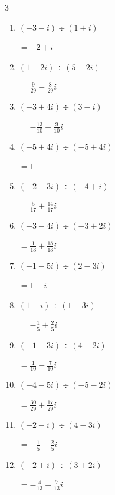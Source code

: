 \begin{multicols}{3}
\begin{enumerate}
        $\displaystyle =\frac{19}{34}+\frac{9}{34}i$

  \item $\displaystyle (-3-i)\div(1+i)$

        $\displaystyle =-2+i$

  \item $\displaystyle (1-2i)\div(5-2i)$

        $\displaystyle =\frac{9}{29}-\frac{8}{29}i$

  \item $\displaystyle (-3+4i)\div(3-i)$

        $\displaystyle =-\frac{13}{10}+\frac{9}{10}i$

  \item $\displaystyle (-5+4i)\div(-5+4i)$

        $\displaystyle =1$

  \item $\displaystyle (-2-3i)\div(-4+i)$

        $\displaystyle =\frac{5}{17}+\frac{14}{17}i$

  \item $\displaystyle (-3-4i)\div(-3+2i)$

        $\displaystyle =\frac{1}{13}+\frac{18}{13}i$

  \item $\displaystyle (-1-5i)\div(2-3i)$

        $\displaystyle =1-i$

  \item $\displaystyle (1+i)\div(1-3i)$

        $\displaystyle =-\frac{1}{5}+\frac{2}{5}i$

\columnbreak %

  \item $\displaystyle (-1-3i)\div(4-2i)$

        $\displaystyle =\frac{1}{10}-\frac{7}{10}i$

  \item $\displaystyle (-4-5i)\div(-5-2i)$

        $\displaystyle =\frac{30}{29}+\frac{17}{29}i$

  \item $\displaystyle (-2-i)\div(4-3i)$

        $\displaystyle =-\frac{1}{5}-\frac{2}{5}i$

  \item $\displaystyle (-2+i)\div(3+2i)$

        $\displaystyle =-\frac{4}{13}+\frac{7}{13}i$


\end{enumerate}
\end{multicols}

